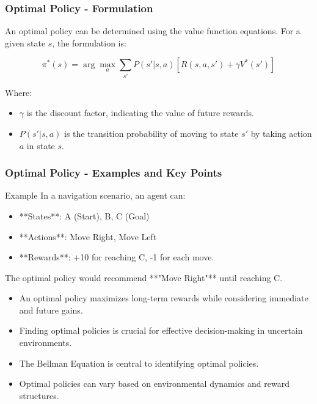 \documentclass[aspectratio=169]{beamer}
\begin{document}
\begin{frame}[fragile]
    \frametitle{Optimal Policy - Formulation}
    An optimal policy can be determined using the value function equations. For a given state \( s \), the formulation is:

    \begin{equation}
        \pi^*(s) = \arg\max_a \sum_{s'} P(s'|s,a) [R(s,a,s') + \gamma V^*(s')]
    \end{equation}
    
    Where:
    \begin{itemize}
        \item \( \gamma \) is the discount factor, indicating the value of future rewards.
        \item \( P(s'|s,a) \) is the transition probability of moving to state \( s' \) by taking action \( a \) in state \( s \).
    \end{itemize}
\end{frame}

\begin{frame}[fragile]
    \frametitle{Optimal Policy - Examples and Key Points}
    \begin{block}{Example}
        In a navigation scenario, an agent can:
        \begin{itemize}
            \item **States**: A (Start), B, C (Goal)
            \item **Actions**: Move Right, Move Left
            \item **Rewards**: +10 for reaching C, -1 for each move.
        \end{itemize}
        The optimal policy would recommend **"Move Right"** until reaching C.
    \end{block}
    
    \begin{itemize}
        \item An optimal policy maximizes long-term rewards while considering immediate and future gains.
        \item Finding optimal policies is crucial for effective decision-making in uncertain environments.
        \item The Bellman Equation is central to identifying optimal policies.
        \item Optimal policies can vary based on environmental dynamics and reward structures.
    \end{itemize}
\end{frame}
\end{document}
